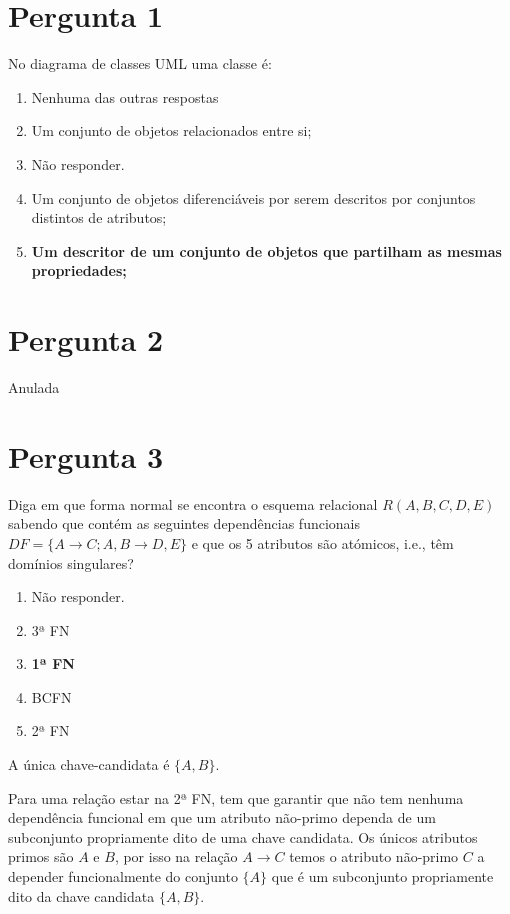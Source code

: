 \documentclass[type=normal, year=2014/15]{bdad_exam}
\begin{document}
{
\renewcommand{\thechapter}{\arabic{chapter}N}
\setcounter{chapter}{14}

\section{Pergunta 1} 
No diagrama de classes UML uma classe é:
\begin{enumerate}[label=\alph*.]\itemsep0em
    \item Nenhuma das outras respostas
    \item Um conjunto de objetos relacionados entre si;
    \item Não responder.
    \item Um conjunto de objetos diferenciáveis por serem descritos por conjuntos distintos de atributos;
    \item \textbf{Um descritor de um conjunto de objetos que partilham as mesmas propriedades; \greencheckmark}
\end{enumerate}

\section{Pergunta 2}
Anulada

\section{Pergunta 3}
Diga em que forma normal se encontra o esquema relacional $R(A,B,C,D,E)$ sabendo que contém as seguintes dependências funcionais $DF=\{A \rightarrow C; A,B \rightarrow D,E\}$ e que os 5 atributos são atómicos, i.e., têm domínios singulares?
\begin{enumerate}[label=\alph*.]\itemsep0em
    \item Não responder.
    \item 3ª FN
    \item \textbf{1ª FN \greencheckmark}
    \item BCFN
    \item 2ª FN
\end{enumerate}
A única chave-candidata é $\{A,B\}$.

Para uma relação estar na 2ª FN, tem que garantir que não tem nenhuma dependência funcional em que um atributo não-primo dependa de um subconjunto propriamente dito de uma chave candidata. Os únicos atributos primos são $A$ e $B$, por isso na relação $A \rightarrow C$ temos o atributo não-primo $C$ a depender funcionalmente do conjunto $\{A\}$ que é um subconjunto propriamente dito da chave candidata $\{A,B\}$.

}
\end{document}

